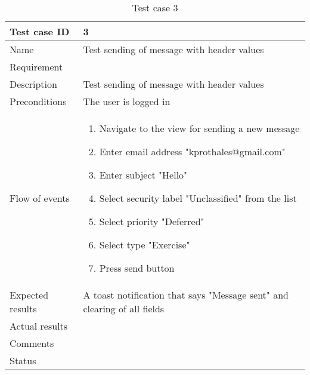 \begin{table}
\begin{tabular}{l|p{10cm}}
Test case ID & 3 \\ \hline
Name & Test sending of message with header values\\ \hline
Requirement & \\ \hline
Description & Test sending of message with header values\\ \hline
Preconditions & The user is logged in\\ \hline
Flow of events & 
\begin{enumerate}
\item{}Navigate to the view for sending a new message
\item{}Enter email address "kprothales@gmail.com"
\item{}Enter subject "Hello"
\item{}Select security label "Unclassified" from the list
\item{}Select priority "Deferred"
\item{}Select type "Exercise"
\item{}Press send button
\end{enumerate} \\ \hline
Expected results & A toast notification that says "Message sent" and clearing of all fields\\ \hline \hline
Actual results & \\ \hline
Comments & \\ \hline
Status & 
\end{tabular}
\caption{Test case 3} \label{tab:case3}
\end{table}

